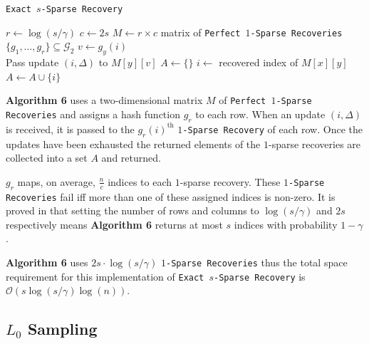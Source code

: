 \documentclass[11pt,twoside,a4paper]{report}
\begin{document}
\begin{algorithm}
	\caption{\texttt{Exact $s$-Sparse Recovery}}
	$r\leftarrow\log(s/\gamma)$
	$c\leftarrow2s$
	$M\leftarrow$$r\times c$ matrix of \texttt{Perfect $1$-Sparse Recoveries}\\
	$\{g_1,\dots,g_r\}\subseteq\mathcal{G}_2$
	 {
		 {
			$v\leftarrow g_y(i)$\\
			Pass update $(i,\Delta)$ to $M[y][v]$
		}
	}
	$A\leftarrow\{\}$
	 {
		 {
			$i\leftarrow$ recovered index of $M[x][y]$\\
			 {$A\leftarrow A\cup\{i\}$}
		}
	}
\end{algorithm}

\par \textbf{Algorithm 6} uses a two-dimensional matrix $M$ of \texttt{Perfect $1$-Sparse Recoveries} and assigns a hash function $g_r$ to each row. When an update $(i,\Delta)$ is received, it is passed to the $g_r(i)^\text{th}$ \texttt{$1$-Sparse Recovery} of each row.
Once the updates have been exhausted the returned elements of the $1$-sparse recoveries are collected into a set $A$ and returned.
\par $g_r$ maps, on average, $\frac{n}c$ indices to each $1$-sparse recovery. These \texttt{$1$-Sparse Recoveries} fail iff more than one of these assigned indices is non-zero. It is proved in \cite{L0Framework} that setting the number of rows and columns to $\log(s/\gamma)$ and $2s$ respectively means \textbf{Algorithm 6} returns at most $s$ indices with probability $1-\gamma$.

\par \textbf{Algorithm 6} uses $2s\cdot\log(s/\gamma)$ \texttt{$1$-Sparse Recoveries} thus the total space requirement for this implementation of \texttt{Exact $s$-Sparse Recovery} is $\mathcal{O}(s\log(s/\gamma)\log(n))$.

\subsection{$L_0$ Sampling}
\end{document}
